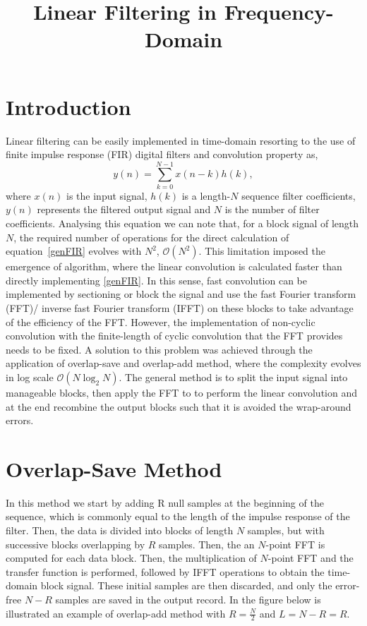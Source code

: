 \documentclass[a4paper]{article}
\title{Linear Filtering in Frequency-Domain}
\author{ }
\date{ }
\begin{document}
\maketitle
\section{Introduction}
Linear filtering can be easily implemented in time-domain resorting to the use of finite impulse response (FIR) digital filters and convolution property as,
\begin{equation}
    y(n)= \sum\limits_{k=0}^{N-1} x(n-k)h\left(k\right),
    \label{genFIR}
\end{equation}
where $x(n)$ is the input signal, $h(k)$ is a length-$N$ sequence filter coefficients, $y(n)$ represents the filtered output signal and $N$ is the number of filter coefficients.
Analysing this equation we can note that, for a block signal of length $N$, the required number of operations for the direct calculation of equation~\eqref{genFIR} evolves with $N^2$, $\mathcal{O}(N^2)$. This limitation imposed the emergence of algorithm, where the linear convolution is calculated faster than directly implementing \eqref{genFIR}.
In this sense, fast convolution can be implemented by sectioning or block the signal and use the fast Fourier transform (FFT)/ inverse fast Fourier transform (IFFT) on these blocks to take advantage of the efficiency of the FFT. However, the implementation of non-cyclic convolution with the finite-length of cyclic convolution that the FFT provides needs to be fixed. A solution to this problem was achieved through the application of overlap-save and overlap-add method, where the complexity evolves in log scale $\mathcal{O}(N\log_2N)$. The general method is to split the input signal into manageable blocks, then apply the FFT to to perform the linear convolution and at the end recombine the output blocks such that it is avoided the wrap-around errors.

\section{Overlap-Save Method}
In this method we start by adding R null samples at the beginning of the sequence, which is commonly equal to the length of the impulse response of the filter. Then, the data is divided into blocks of length $N$ samples, but with successive blocks overlapping by $R$ samples.
Then, the an $N$-point FFT is computed for each data block. Then, the multiplication of $N$-point FFT and the transfer function is performed, followed by IFFT operations to obtain the time-domain block signal. These initial samples are then discarded, and only the error-free $N-R$ samples are saved in the output record.
In the figure below is illustrated an example of overlap-add method with $R=\frac{N}{2}$ and $L=N-R=R$.
\end{document}
